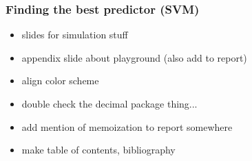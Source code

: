 \documentclass{beamer}
\begin{document}
\begin{frame}
\frametitle{Finding the best predictor (SVM)}
 \begin{itemize}
     \item slides for simulation stuff
     \item appendix slide about playground (also add to report)
     \item align color scheme
     \item double check the decimal package thing...
     \item add mention of memoization to report somewhere
     \item make table of contents, bibliography
 \end{itemize}
\end{frame}


    
\end{document}

